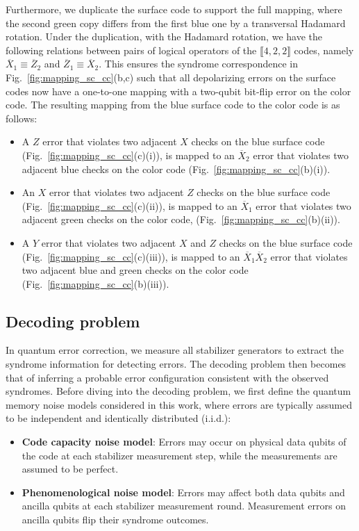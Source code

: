 \documentclass[%
 reprint,
 amsmath,amssymb,
 aps,
]{revtex4-2}
\begin{document}
Furthermore, we duplicate the surface code to support the full mapping, where the second green copy differs from the first blue one by a transversal Hadamard rotation. Under the duplication, with the Hadamard rotation, we have the following relations between pairs of logical operators of the $\llbracket 4,2,2 \rrbracket$ codes, namely $\overline{X}_1\equiv \overline{Z}_2$ and $\overline{Z}_1\equiv \overline{X}_2$. This ensures the syndrome correspondence in Fig.~\ref{fig:mapping_sc_cc}(b,c) such that all depolarizing errors on the surface codes now have a one-to-one mapping with a two-qubit bit-flip error on the color code.
The resulting mapping from the blue surface code to the color code is as follows:
\begin{itemize}
    \item A $Z$ error that violates two adjacent $X$ checks on the blue surface code (Fig.~\ref{fig:mapping_sc_cc}(c)(i)), is mapped to an $\overline{X}_2$ error that violates two adjacent blue checks on the color code (Fig.~\ref{fig:mapping_sc_cc}(b)(i)).
    \item An $X$ error that violates two adjacent $Z$ checks on the blue surface code (Fig.~\ref{fig:mapping_sc_cc}(c)(ii)), is mapped to an $\overline{X}_1$ error that violates two adjacent green checks on the color code, (Fig.~\ref{fig:mapping_sc_cc}(b)(ii)).
    \item A $Y$ error that violates two adjacent $X$ and $Z$ checks on the blue surface code (Fig.~\ref{fig:mapping_sc_cc}(c)(iii)), is mapped to an $\overline{X}_1\overline{X}_2$ error that violates two adjacent blue and green checks on the color code (Fig.~\ref{fig:mapping_sc_cc}(b)(iii)).

\end{itemize}


\subsection{\label{subsec:decoding}Decoding problem}
In quantum error correction, we measure all stabilizer generators to extract the syndrome information for detecting errors. The decoding problem then becomes that of inferring a probable error configuration consistent with the observed syndromes. Before diving into the decoding problem, we first define the quantum memory noise models considered in this work, where errors are typically assumed to be independent and identically distributed (i.i.d.):
\begin{itemize}
    \item \textbf{Code capacity noise model}: Errors may occur on physical data qubits of the code at each stabilizer measurement step, while the measurements are assumed to be perfect.
    \item \textbf{Phenomenological noise model}: Errors may affect both data qubits and ancilla qubits at each stabilizer measurement round. Measurement errors on ancilla qubits flip their syndrome outcomes.

\end{itemize}
\end{document}
